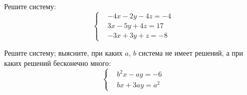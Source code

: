 %
%


\begin{problems}

\item
Решите систему:
\[\left\{\begin{aligned}&
    - 4 x - 2 y - 4 z = - 4
\\&
    3 x - 5 y + 4 z = 17
\\&
    - 3 x + 3 y + z = - 8
\end{aligned}\right.\]

\item
Решите систему; выясните, при каких $a$, $b$ система не имеет решений, а при
каких решений бесконечно много:
\[\left\{\begin{aligned}&
    b^2 x - a y = -6
\\&
    b x + 3 a y = a^2
\end{aligned}\right.\]

\end{problems}

